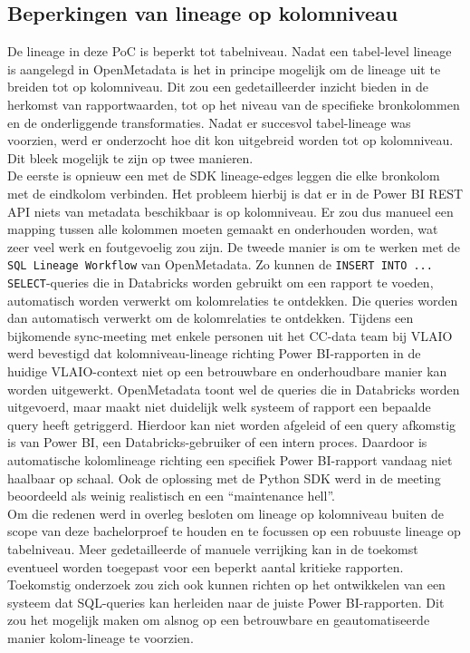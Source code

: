 \subsection{Beperkingen van lineage op kolomniveau}

De lineage in deze PoC is beperkt tot tabelniveau. Nadat een tabel-level lineage is aangelegd in OpenMetadata is het in principe mogelijk om de lineage uit te breiden tot op kolomniveau. Dit zou een gedetailleerder inzicht bieden in de herkomst van rapportwaarden, tot op het niveau van de specifieke bronkolommen en de onderliggende transformaties. Nadat er succesvol tabel-lineage was voorzien, werd er onderzocht hoe dit kon uitgebreid worden tot op kolomniveau. Dit bleek mogelijk te zijn op twee manieren.\\ 

De eerste is opnieuw een met de SDK lineage-edges leggen die elke bronkolom met de eindkolom verbinden. Het probleem hierbij is dat er in de Power BI REST API niets van metadata beschikbaar is op kolomniveau. Er zou dus manueel een mapping tussen alle kolommen moeten gemaakt en onderhouden worden, wat zeer veel werk en foutgevoelig zou zijn. 
De tweede manier is om te werken met de \texttt{SQL Lineage Workflow} van OpenMetadata. Zo kunnen de \texttt{INSERT INTO ... SELECT}-queries die in Databricks worden gebruikt om een rapport te voeden, automatisch worden verwerkt om kolomrelaties te ontdekken. Die queries worden dan automatisch verwerkt om de kolomrelaties te ontdekken. Tijdens een bijkomende sync-meeting met enkele personen uit het CC-data team bij VLAIO werd bevestigd dat kolomniveau-lineage richting Power BI-rapporten in de huidige VLAIO-context niet op een betrouwbare en onderhoudbare manier kan worden uitgewerkt. OpenMetadata toont wel de queries die in Databricks worden uitgevoerd, maar maakt niet duidelijk welk systeem of rapport een bepaalde query heeft getriggerd. Hierdoor kan niet worden afgeleid of een query afkomstig is van Power BI, een Databricks-gebruiker of een intern proces. Daardoor is automatische kolomlineage richting een specifiek Power BI-rapport vandaag niet haalbaar op schaal. Ook de oplossing met de Python SDK werd in de meeting beoordeeld als weinig realistisch en een ``maintenance hell''.\\

Om die redenen werd in overleg besloten om lineage op kolomniveau buiten de scope van deze bachelorproef te houden en te focussen op een robuuste lineage op tabelniveau. Meer gedetailleerde of manuele verrijking kan in de toekomst eventueel worden toegepast voor een beperkt aantal kritieke rapporten. Toekomstig onderzoek zou zich ook kunnen richten op het ontwikkelen van een systeem dat SQL-queries kan herleiden naar de juiste Power BI-rapporten. Dit zou het mogelijk maken om alsnog op een betrouwbare en geautomatiseerde manier kolom-lineage te voorzien.\\

